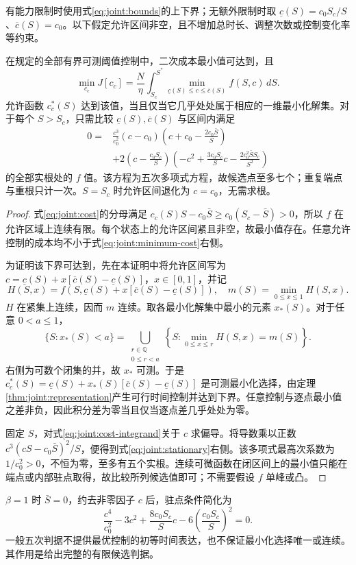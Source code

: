 \documentclass[lang=cn,a4paper,newtx]{elegantpaper}
\numberwithin{equation}{section}
\theoremstyle{plain}
\begin{document}
有能力限制时使用式\eqref{eq:joint:bounds}的上下界；无额外限制时取 $\underline c(S)=c_0S_c/S$、$\overline c(S)=c_0$。以下假定允许区间非空，且不增加总时长、调整次数或控制变化率等约束。
\begin{theorem}
\label{thm:joint:cost-minimum}
在规定的全部有界可测阈值控制中，二次成本最小值可达到，且
\begin{equation}
\min_{c_c}J[c_c]
=\frac{N}{\eta}\int_{S_c}^{S^*}
\min_{\underline c(S)\le c\le\overline c(S)}f(S,c)\,dS.
\label{eq:joint:minimum-cost}
\end{equation}
允许函数 $c_c^*(S)$ 达到该值，当且仅当它几乎处处属于相应的一维最小化解集。对于每个 $S>S_c$，只需比较 $\underline c(S),\overline c(S)$ 与区间内满足
\begin{equation}
\begin{split}
0={}&\frac{c^3}{c_0^2}(c-c_0)
\left(c+c_0-\frac{2c_0\bar S}{S}\right)\\
&+2\left(c-\frac{c_0S_c}{S}\right)
\left(-c^2+\frac{3c_0S_c}{S}c-
\frac{2c_0^2\bar S S_c}{S^2}\right)
\end{split}
\label{eq:joint:stationary}
\end{equation}
的全部实根处的 $f$ 值。该方程为五次多项式方程，故候选点至多七个；重复端点与重根只计一次。$S=S_c$ 时允许区间退化为 $c=c_0$，无需求根。
\end{theorem}
\begin{proof}
式\eqref{eq:joint:cost}的分母满足
$c_c(S)S-c_0\bar S\ge c_0(S_c-\bar S)>0$，所以 $f$ 在允许区域上连续有限。每个状态上的允许区间紧且非空，故最小值存在。任意允许控制的成本均不小于式\eqref{eq:joint:minimum-cost}右侧。

为证明该下界可达到，先在本证明中将允许区间写为
$c=\underline c(S)+x[\overline c(S)-\underline c(S)]$，$x\in[0,1]$，并记
\[
H(S,x)=f\!\left(S,\underline c(S)+x[\overline c(S)-\underline c(S)]\right),
\quad m(S)=\min_{0\le x\le1}H(S,x).
\]
$H$ 在紧集上连续，因而 $m$ 连续。取各最小化解集中最小的元素 $x_*(S)$。对于任意 $0<a\le1$，
\[
\{S:x_*(S)<a\}
=\bigcup_{\substack{r\in\mathbb Q\\0\le r<a}}
\left\{S:\min_{0\le x\le r}H(S,x)=m(S)\right\}.
\]
右侧为可数个闭集的并，故 $x_*$ 可测。于是
$c_c^*(S)=\underline c(S)+x_*(S)[\overline c(S)-\underline c(S)]$
是可测最小化选择，由定理\ref{thm:joint:representation}产生可行时间控制并达到下界。任意控制与逐点最小值之差非负，因此积分差为零当且仅当逐点差几乎处处为零。

固定 $S$，对式\eqref{eq:joint:cost-integrand}关于 $c$ 求偏导。将导数乘以正数
$c^3(cS-c_0\bar S)^2/S$，便得到式\eqref{eq:joint:stationary}右侧。该多项式最高次系数为 $1/c_0^2>0$，不恒为零，至多有五个实根。连续可微函数在闭区间上的最小值只能在端点或内部驻点取得，故比较所列候选值即可；不需要假设 $f$ 单峰或凸。
\end{proof}
$\beta=1$ 时 $\bar S=0$，约去非零因子 $c$ 后，驻点条件简化为
\begin{equation}
\frac{c^4}{c_0^2}-3c^2+\frac{8c_0S_c}{S}c
-6\left(\frac{c_0S_c}{S}\right)^2=0.
\label{eq:joint:quartic}
\end{equation}
一般五次判据不提供最优控制的初等时间表达，也不保证最小化选择唯一或连续。其作用是给出完整的有限候选判据。
\end{document}
